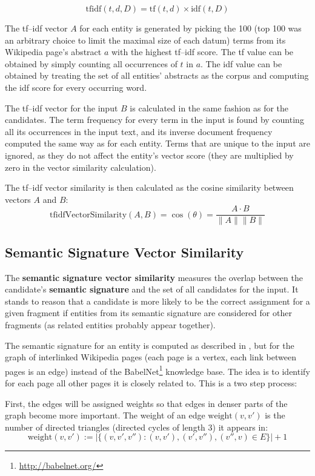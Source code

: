 \documentclass[runningheads,a4paper]{llncs}
\begin{document}
{$$ \mathrm{tfidf}(t, d, D) = \mathrm{tf}(t, d) \times \mathrm{idf}(t, D) $$

The tf--idf vector $A$ for each entity is generated by picking the 100 (top 100 was an arbitrary choice to limit the maximal size of each datum) terms from its Wikipedia page's abstract $a$ with the highest tf--idf score. The tf value can be obtained by simply counting all occurrences of $t$ in $a$. The idf value can be obtained by treating the set of all entities' abstracts as the corpus and computing the idf score for every occurring word.

The tf--idf vector for the input $B$ is calculated in the same fashion as for the candidates. The term frequency for every term in the input is found by counting all its occurrences in the input text, and its inverse document frequency computed the same way as for each entity. Terms that are unique to the input are ignored, as they do not affect the entity's vector score (they are multiplied by zero in the vector similarity calculation).

The tf--idf vector similarity is then calculated as the cosine similarity between vectors $A$ and $B$:
$$\mathrm{tfidfVectorSimilarity}(A, B) = \cos(\theta) = \frac{A \cdot B}{\|A\| \|B\|}$$

\subsection{Semantic Signature Vector Similarity}
The \textbf{semantic signature vector similarity} measures the overlap between the candidate's \textbf{semantic signature} and the set of all candidates for the input. It stands to reason that a candidate is more likely to be the correct assignment for a given fragment if entities from its semantic signature are considered for other fragments (as related entities probably appear together).

The semantic signature for an entity is computed as described in \cite{Babelfy}, but for the graph of interlinked Wikipedia pages (each page is a vertex, each link between pages is an edge) instead of the BabelNet\footnote{\url{http://babelnet.org/}} knowledge base. The idea is to identify for each page all other pages it is closely related to. This is a two step process:

First, the edges will be assigned weights so that edges in denser parts of the graph become more important. The weight of an edge $\mathrm{weight}(v, v')$ is the number of directed triangles (directed cycles of length 3) it appears in:
$$\mathrm{weight}(v, v') := |\{(v, v', v'') : (v, v'), (v', v''), (v'', v) \in E\}| + 1$$

}
\end{document}
